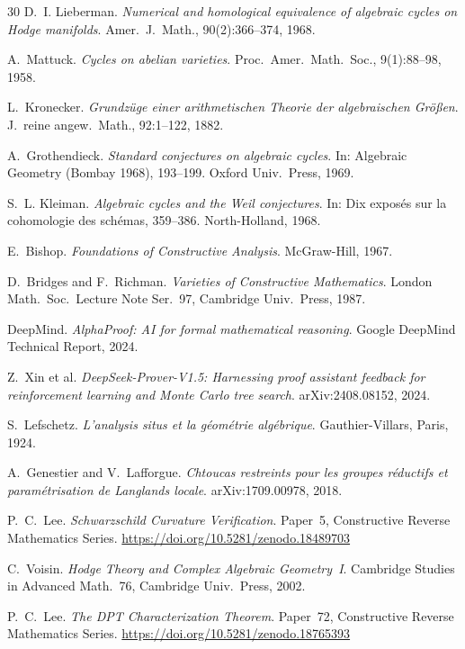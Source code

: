 \documentclass[11pt]{article}
\theoremstyle{plain}
\theoremstyle{definition}
\theoremstyle{remark}
\begin{document}
\begin{thebibliography}{30}
D.~I. Lieberman.
\newblock \emph{Numerical and homological equivalence of algebraic cycles
  on Hodge manifolds}.
\newblock Amer.\ J.\ Math., 90(2):366--374, 1968.

A.~Mattuck.
\newblock \emph{Cycles on abelian varieties}.
\newblock Proc.\ Amer.\ Math.\ Soc., 9(1):88--98, 1958.

L.~Kronecker.
\newblock \emph{Grundz\"uge einer arithmetischen Theorie der algebraischen
  Gr\"o\ss en}.
\newblock J.~reine angew.\ Math., 92:1--122, 1882.

A.~Grothendieck.
\newblock \emph{Standard conjectures on algebraic cycles}.
\newblock In: Algebraic Geometry (Bombay 1968), 193--199.
  Oxford Univ.\ Press, 1969.

S.~L. Kleiman.
\newblock \emph{Algebraic cycles and the Weil conjectures}.
\newblock In: Dix expos\'es sur la cohomologie des sch\'emas,
  359--386. North-Holland, 1968.

E.~Bishop.
\newblock \emph{Foundations of Constructive Analysis}.
\newblock McGraw-Hill, 1967.

D.~Bridges and F.~Richman.
\newblock \emph{Varieties of Constructive Mathematics}.
\newblock London Math.\ Soc.\ Lecture Note Ser.~97, Cambridge Univ.\ Press,
  1987.

DeepMind.
\newblock \emph{AlphaProof: AI for formal mathematical reasoning}.
\newblock Google DeepMind Technical Report, 2024.

Z.~Xin et al.
\newblock \emph{DeepSeek-Prover-V1.5: Harnessing proof assistant feedback
  for reinforcement learning and Monte Carlo tree search}.
\newblock arXiv:2408.08152, 2024.

S.~Lefschetz.
\newblock \emph{L'analysis situs et la g\'eom\'etrie alg\'ebrique}.
\newblock Gauthier-Villars, Paris, 1924.

A.~Genestier and V.~Lafforgue.
\newblock \emph{Chtoucas restreints pour les groupes r\'eductifs
  et param\'etrisation de Langlands locale}.
\newblock arXiv:1709.00978, 2018.

P.~C.~Lee.
\newblock \emph{Schwarzschild Curvature Verification}.
\newblock Paper~5, Constructive Reverse Mathematics Series.
\newblock \url{https://doi.org/10.5281/zenodo.18489703}

C.~Voisin.
\newblock \emph{Hodge Theory and Complex Algebraic Geometry~I}.
\newblock Cambridge Studies in Advanced Math.~76,
  Cambridge Univ.\ Press, 2002.

P.~C.~Lee.
\newblock \emph{The DPT Characterization Theorem}.
\newblock Paper~72, Constructive Reverse Mathematics Series.
\newblock \url{https://doi.org/10.5281/zenodo.18765393}

\end{thebibliography}
\end{document}
